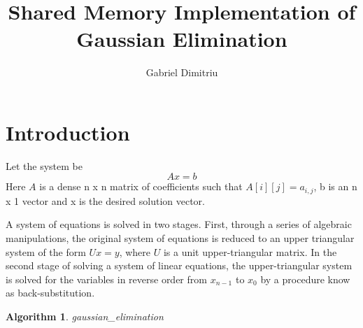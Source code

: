 \documentclass[a4paper]{article}
\newtheorem{algorithm}[theorem]{Algorithm}
\begin{document}
\title{Shared Memory Implementation of Gaussian Elimination}
\date{}
\author{Gabriel Dimitriu}
\maketitle

\section{Introduction}

Let the system be 
\begin{equation}
Ax=b  \label{s1}
\end{equation}%
\qquad \qquad Here $A$ is a dense n x n matrix of coefficients such that $%
A[i][j]=a_{i,j}$, b is an n x 1 vector and x is the desired solution vector.

A system of equations is solved in two stages. First, through a series of
algebraic manipulations, the original system of equations is reduced to an
upper triangular system of the form $Ux=y$, where $U$ is a unit
upper-triangular matrix. In the second stage of solving a system of linear
equations, the upper-triangular system is solved for the variables in
reverse order from $x_{n-1}$ to $x_{0}$ by a procedure know as
back-substitution.

\begin{algorithm}
gaussian\_elimination
\end{algorithm}
\end{document}

